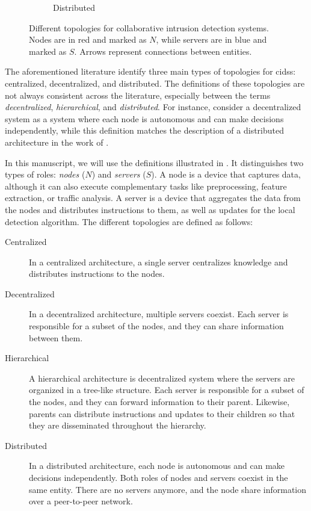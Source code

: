 \begin{figure}
\begin{subfigure}{.25\textwidth}
    \caption{Distributed}
    \label{fig:cids.distributed}
  \end{subfigure}
  \caption[
    Different topologies for collaborative intrusion detection systems.
  ]{
    Different topologies for collaborative intrusion detection systems.
    Nodes are in red and marked as $N$, while servers are in blue and marked as $S$.
    Arrows represent connections between entities.
    \label{fig:cids.topoligies}
  } 
\end{figure}

The aforementioned literature identify three main types of topologies for \glspl{cids}: centralized, decentralized, and distributed.
The definitions of these topologies are not always consistent across the literature, especially between the terms \emph{decentralized}, \emph{hierarchical}, and \emph{distributed}.
For instance, \textcite{zhou_surveycoordinatedattacks_2010} consider a decentralized system as a system where each node is autonomous and can make decisions independently, while this definition matches the description of a distributed architecture in the work of \textcite{li_SurveyingTrustBasedCollaborative_2022}.

In this manuscript, we will use the definitions illustrated in .
It distinguishes two types of roles: \emph{nodes} ($N$) and \emph{servers} ($S$).
A node is a device that captures data, although it can also execute complementary tasks like preprocessing, feature extraction, or traffic analysis.
A server is a device that aggregates the data from the nodes and distributes instructions to them, as well as updates for the local detection algorithm.
The different topologies are defined as follows:
\begin{description}
  \item[Centralized] In a centralized architecture, a single server centralizes knowledge and distributes instructions to the nodes.
  \item[Decentralized] In a decentralized architecture, multiple servers coexist.
    Each server is responsible for a subset of the nodes, and they can share information between them.
  \item[Hierarchical] A hierarchical architecture is decentralized system where the servers are organized in a tree-like structure.
    Each server is responsible for a subset of the nodes, and they can forward information to their parent.
    Likewise, parents can distribute instructions and updates to their children so that they are disseminated throughout the hierarchy.
  \item[Distributed] In a distributed architecture, each node is autonomous and can make decisions independently.
    Both roles of nodes and servers coexist in the same entity.
    There are no servers anymore, and the node share information over a peer-to-peer network.
\end{description}

